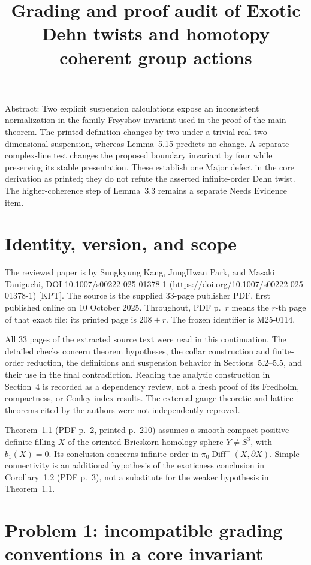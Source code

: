 \documentclass[10pt]{article}
\title{Grading and proof audit of
Exotic Dehn twists and homotopy coherent group actions}
\author{}
\date{}
\begin{document}
\maketitle
Abstract: Two explicit suspension calculations expose an inconsistent normalization in the family Frøyshov invariant used in the proof of the main theorem. The printed definition changes by two under a trivial real two-dimensional suspension, whereas Lemma 5.15 predicts no change. A separate complex-line test changes the proposed boundary invariant by four while preserving its stable presentation. These establish one Major defect in the core derivation as printed; they do not refute the asserted infinite-order Dehn twist. The higher-coherence step of Lemma 3.3 remains a separate Needs Evidence item.\par
\section*{Identity, version, and scope}
The reviewed paper is by Sungkyung Kang, JungHwan Park, and Masaki Taniguchi, DOI 10.1007/s00222-025-01378-1 (https://doi.org/10.1007/s00222-025-01378-1) [KPT]. The source is the supplied 33-page publisher PDF, first published online on 10 October 2025. Throughout, PDF p. \(r\) means the \(r\)-th page of that exact file; its printed page is \(208+r\). The frozen identifier is M25-0114.\par
All 33 pages of the extracted source text were read in this continuation. The detailed checks concern theorem hypotheses, the collar construction and finite-order reduction, the definitions and suspension behavior in Sections 5.2–5.5, and their use in the final contradiction. Reading the analytic construction in Section 4 is recorded as a dependency review, not a fresh proof of its Fredholm, compactness, or Conley-index results. The external gauge-theoretic and lattice theorems cited by the authors were not independently reproved.\par
Theorem 1.1 (PDF p. 2, printed p. 210) assumes a smooth compact positive-definite filling \(X\) of the oriented Brieskorn homology sphere \(Y\ne S^3\), with \(b_1(X)=0\). Its conclusion concerns infinite order in \(\pi_0\operatorname{Diff}^+(X,\partial X)\). Simple connectivity is an additional hypothesis of the exoticness conclusion in Corollary 1.2 (PDF p. 3), not a substitute for the weaker hypothesis in Theorem 1.1.\par
\section*{Problem 1: incompatible grading conventions in a core invariant}
\end{document}
